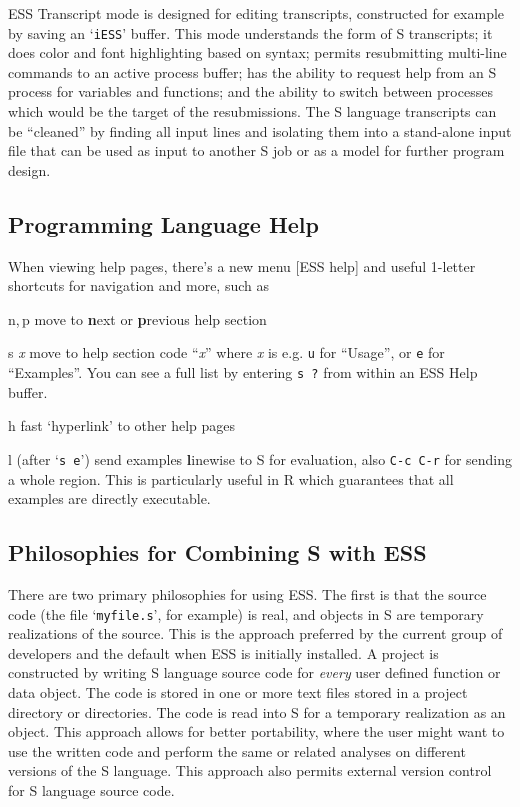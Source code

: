 \documentclass{article}
\newcommand{\stexttt}[1]{{\small\texttt{#1}}}
\newcommand{\file}[1]{`\stexttt{#1}'}
\begin{document}
ESS Transcript mode is designed for editing transcripts, constructed for
example by saving an \file{iESS} buffer.  This mode understands the form
of S transcripts; it does color and font highlighting based on syntax;
permits resubmitting multi-line commands to an active process buffer;
has the ability to request help from an S process for variables and
functions; and the ability to switch between processes which would be
the target of the resubmissions.  The S language transcripts can be
``cleaned'' by finding all input lines and isolating them into a
stand-alone input file that can be used as input to another S job or as
a model for further program design.

\subsection{Programming Language Help}
\label{sec:S:help}

When viewing help pages, there's a new menu \textsf{[ESS help]} and
useful 1-letter shortcuts for navigation and more, such as
\begin{list}{}{\renewcommand{\makelabel}[1]{\bf#1\hfill}}
 \item[n,\,p] move to \textbf{n}ext or \textbf{p}revious help section
 \item[{s \textit{x}}] move to help section code ``\textit{x}'' where
  \textit{x} is e.g. \stexttt{u} for ``Usage'', or \stexttt{e} for
  ``Examples''.  You can see a full list by entering \stexttt{s ?} from
  within an ESS Help buffer.
 \item[h] fast `hyperlink' to other help pages
 \item[l] (after `\stexttt{s e}') send examples \textbf{l}inewise to S
  for evaluation, also \stexttt{C-c C-r} for sending a whole region.
  This is particularly useful in R which guarantees that all examples
  are directly executable.
\end{list}

\subsection{Philosophies for Combining S with ESS}
\label{sec:S:philosophy}

There are two primary philosophies for using ESS.  The first is that the
source code (the file \file{myfile.s}, for example) is real, and objects
in S are temporary realizations of the source.  This is the approach
preferred by the current group of developers and the default when ESS is
initially installed.  A project is constructed by writing S language
source code for \emph{every} user defined function or data object.  The
code is stored in one or more text files stored in a project directory
or directories.  The code is read into S for a temporary realization as
an object.  This approach allows for better portability, where the user
might want to use the written code and perform the same or related
analyses on different versions of the S language.  This approach also
permits external version control for S language source code.
\end{document}
